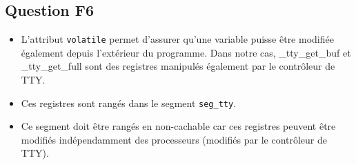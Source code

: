\documentclass[10pt]{article}
\begin{document}
\subsection{Question F6}
\begin{itemize}
  \item L'attribut \texttt{volatile} permet d'assurer qu'une variable puisse
  être modifiée également depuis l'extérieur du programme. Dans notre cas,
  \_tty\_get\_buf et \_tty\_get\_full sont des registres manipulés également par
  le contrôleur de TTY.
  \item Ces registres sont rangés dans le segment \texttt{seg\_tty}.
  \item Ce segment doit être rangés en non-cachable car ces registres peuvent
  être modifiés indépendamment des processeurs (modifiés par le contrôleur de
  TTY).
\end{itemize}

\newpage



\newpage


\newpage

\newpage

\end{document}
